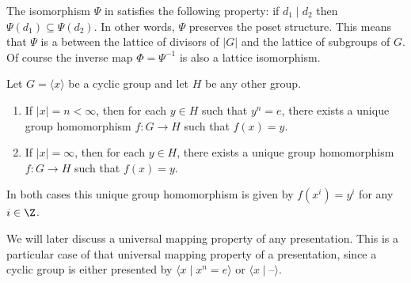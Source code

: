 \begin{remark}
The isomorphism $\Psi$ in  satisfies the following property: if $d_1\mid d_2$ then $\Psi(d_1)\subseteq \Psi(d_2)$. In other words, $\Psi$ preserves the poset structure. This means that $\Psi$ is a  between the lattice of divisors of $|G|$ and the lattice of subgroups of $G$. Of course the inverse map $\Phi =\Psi^{-1}$ is also a lattice isomorphism.
\end{remark}

\begin{lemma}\label{UMP for cyclic groups}
Let $G = \langle x \rangle$ be a cyclic group and let $H$ be any other group. 

\begin{enumerate}
	\item If $|x| = n < \infty$, then for each $y \in H$ such that $y^n = e$, 
there exists a unique group homomorphism $f\!: G \to H$ such that $f(x) = y$. 

\item If $|x| = \infty$, then for each $y \in H$,  there exists a unique group homomorphism $f\!: G \to H$ such that $f(x) = y$. 
\end{enumerate}
In both cases this unique group homomorphism is given by $f(x^i)=y^i$ for any $i \in \Z$.
\end{lemma}

\begin{remark} 
We will later discuss a universal mapping property of any presentation.
This is a particular case of that universal mapping property of a presentation, since a cyclic group is either presented by $\langle x \mid x^n = e \rangle$ or $\langle x \mid \textrm{--} \rangle$.
\end{remark}

